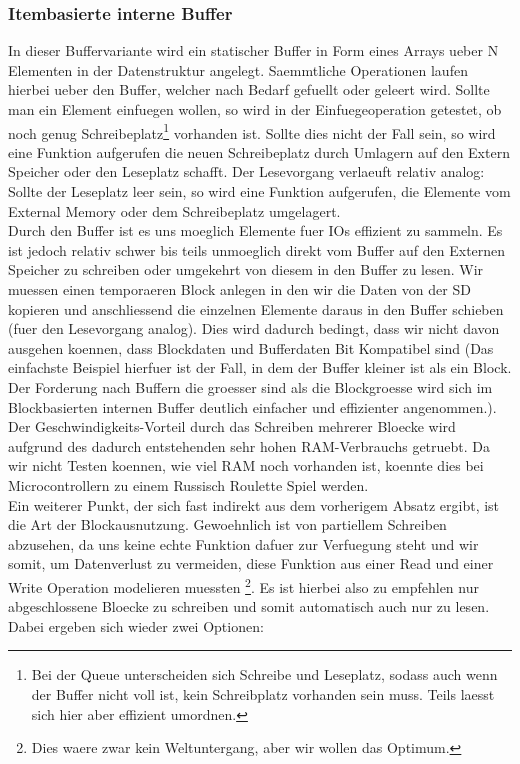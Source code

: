 \documentclass[10pt,a4paper]{article}
\begin{document}
\subsubsection{Itembasierte interne Buffer}
In dieser Buffervariante wird ein statischer Buffer in Form eines Arrays ueber N Elementen in der Datenstruktur angelegt. Saemmtliche Operationen laufen hierbei ueber den Buffer, welcher nach Bedarf gefuellt oder geleert wird. Sollte man ein Element einfuegen wollen, so wird in der Einfuegeoperation getestet, ob noch genug Schreibeplatz\footnote{Bei der Queue unterscheiden sich Schreibe und Leseplatz, sodass auch wenn der Buffer nicht voll ist, kein Schreibplatz vorhanden sein muss. Teils laesst sich hier aber effizient umordnen.} vorhanden ist. Sollte dies nicht der Fall sein, so wird eine Funktion aufgerufen die neuen Schreibeplatz durch Umlagern auf den Extern Speicher oder den Leseplatz schafft. Der Lesevorgang verlaeuft relativ analog: Sollte der Leseplatz leer sein, so wird eine Funktion aufgerufen, die Elemente vom External Memory oder dem Schreibeplatz umgelagert.\\
Durch den Buffer ist es uns moeglich Elemente fuer IOs effizient zu sammeln. Es ist jedoch relativ schwer bis teils unmoeglich direkt vom Buffer auf den Externen Speicher zu schreiben oder umgekehrt von diesem in den Buffer zu lesen. Wir muessen einen temporaeren Block anlegen in den wir die Daten von der SD kopieren und anschliessend die einzelnen Elemente daraus in den Buffer schieben (fuer den Lesevorgang analog). Dies wird dadurch bedingt, dass wir nicht davon ausgehen koennen, dass Blockdaten und Bufferdaten Bit Kompatibel sind (Das einfachste Beispiel hierfuer ist der Fall, in dem der Buffer kleiner ist als ein Block. Der Forderung nach Buffern die groesser sind als die Blockgroesse wird sich im Blockbasierten internen Buffer deutlich einfacher und effizienter angenommen.). Der Geschwindigkeits-Vorteil durch das Schreiben mehrerer Bloecke wird aufgrund des dadurch entstehenden sehr hohen RAM-Verbrauchs getruebt. Da wir nicht Testen koennen, wie viel RAM noch vorhanden ist, koennte dies bei Microcontrollern zu einem Russisch Roulette Spiel werden.\\
Ein weiterer Punkt, der sich fast indirekt aus dem vorherigem Absatz ergibt, ist die Art der Blockausnutzung. Gewoehnlich ist von partiellem Schreiben abzusehen, da uns keine echte Funktion dafuer zur Verfuegung steht und wir somit, um Datenverlust zu vermeiden, diese Funktion aus einer Read und einer Write Operation modelieren muessten \footnote{Dies waere zwar kein Weltuntergang, aber wir wollen das Optimum.}. Es ist hierbei also zu empfehlen nur abgeschlossene Bloecke zu schreiben und somit automatisch auch nur zu lesen. Dabei ergeben sich wieder zwei Optionen: 
\end{document}
